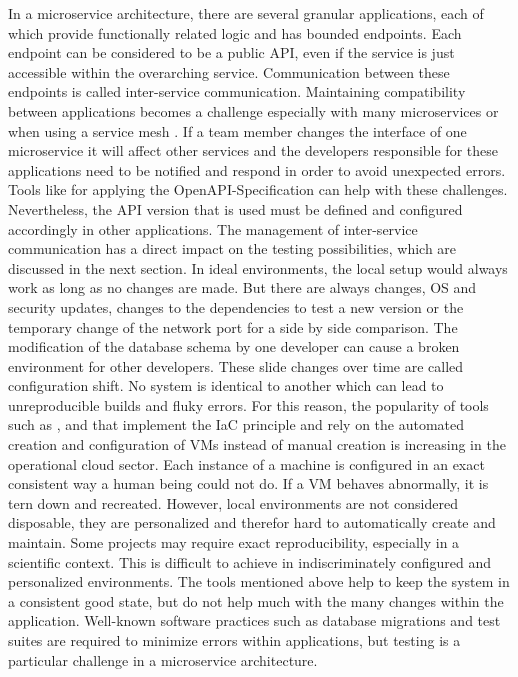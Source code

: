         In a microservice architecture, there are several granular applications, each of which provide functionally related logic and has bounded endpoints. Each endpoint can be considered to be a public \ac{API}, even if the service is just accessible within the overarching service. Communication between these endpoints is called inter-service communication. Maintaining compatibility between applications becomes a challenge especially with many microservices or when using a service mesh \cite{micro}. If a team member changes the interface of one microservice it will affect other services and the developers responsible for these applications need to be notified and respond in order to avoid unexpected errors. Tools like  for applying the OpenAPI-Specification can help with these challenges. Nevertheless, the \ac{API} version that is used must be defined and configured accordingly in other applications. The management of inter-service communication has a direct impact on the testing possibilities, which are discussed in the next section.\newline
        In ideal environments, the local setup would always work as long as no changes are made. But there are always changes, \ac{OS} and security updates, changes to the dependencies to test a new version or the temporary change of the network port for a side by side comparison. The modification of the database schema by one developer can cause a broken environment for other developers. These slide changes over time are called configuration shift. No system is identical to another which can lead to unreproducible builds and fluky errors. For this reason, the popularity of tools such as ,  and  that implement the \ac{IaC} principle and rely on the automated creation and configuration of \ac{VM}s instead of manual creation is increasing in the operational cloud sector. Each instance of a machine is configured in an exact consistent way a human being could not do. If a \ac{VM} behaves abnormally, it is tern down and recreated. However, local environments are not considered disposable, they are personalized and therefor hard to automatically create and maintain. Some projects may require exact reproducibility, especially in a scientific context. This is difficult to achieve in indiscriminately configured and personalized environments.\newline
        The tools mentioned above help to keep the system in a consistent good state, but do not help much with the many changes within the application. Well-known software practices such as database migrations and test suites are required to minimize errors within applications, but testing is a particular challenge in a microservice architecture.


